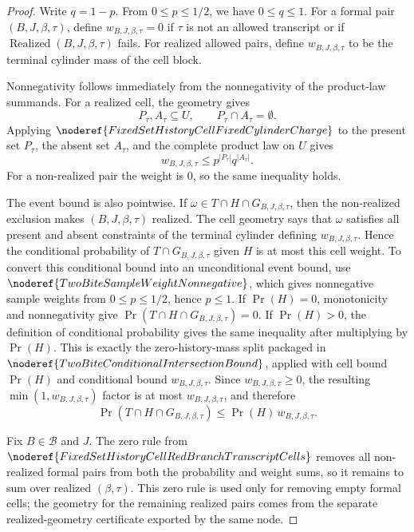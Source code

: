 \begin{proof}
Write \(q=1-p\).  From \(0\le p\le1/2\), we have \(0\le q\le1\).  For a
formal pair \((B,J,\beta,\tau)\), define \(w_{B,J,\beta,\tau}=0\) if
\(\tau\) is not an allowed transcript or if
\(\operatorname{Realized}(B,J,\beta,\tau)\) fails.  For realized allowed
pairs, define \(w_{B,J,\beta,\tau}\) to be the terminal cylinder mass of the
cell block.

Nonnegativity follows immediately from the nonnegativity of the product-law
summands.  For a realized cell, the geometry gives
\[
P_\tau,A_\tau\subseteq U,\qquad P_\tau\cap A_\tau=\emptyset .
\]
Applying \(\noderef{FixedSetHistoryCellFixedCylinderCharge}\) to the present
set \(P_\tau\), the absent set \(A_\tau\), and the complete product law on
\(U\) gives
\[
w_{B,J,\beta,\tau}\le p^{|P_\tau|}q^{|A_\tau|}.
\]
For a non-realized pair the weight is \(0\), so the same inequality holds.

The event bound is also pointwise.  If
\(\omega\in T\cap H\cap G_{B,J,\beta,\tau}\), then the non-realized
exclusion makes \((B,J,\beta,\tau)\) realized.  The cell geometry says that
\(\omega\) satisfies all present and absent constraints of the terminal
cylinder defining \(w_{B,J,\beta,\tau}\).  Hence the conditional probability
of \(T\cap G_{B,J,\beta,\tau}\) given \(H\) is at most this cell weight.  To
convert this conditional bound into an unconditional event bound, use
\(\noderef{TwoBiteSampleWeightNonnegative}\), which gives nonnegative sample
weights from \(0\le p\le1/2\), hence \(p\le1\).  If \(\Pr(H)=0\), monotonicity
and nonnegativity give
\(\Pr(T\cap H\cap G_{B,J,\beta,\tau})=0\).  If \(\Pr(H)>0\), the definition
of conditional probability gives the same inequality after multiplying by
\(\Pr(H)\).  This is exactly the zero-history-mass split packaged in
\(\noderef{TwoBiteConditionalIntersectionBound}\), applied with cell bound
\(\Pr(H)\) and conditional bound \(w_{B,J,\beta,\tau}\).  Since
\(w_{B,J,\beta,\tau}\ge0\), the resulting \( \min(1,w_{B,J,\beta,\tau})\)
factor is at most \(w_{B,J,\beta,\tau}\), and therefore
\[
\Pr(T\cap H\cap G_{B,J,\beta,\tau})
\le \Pr(H)\,w_{B,J,\beta,\tau}.
\]

Fix \(B\in{\mathcal B}\) and \(J\).  The zero rule from
\(\noderef{FixedSetHistoryCellRedBranchTranscriptCells}\) removes all
non-realized formal pairs from both the probability and weight sums, so it
remains to sum over realized \((\beta,\tau)\).  This zero rule is used only
for removing empty formal cells; the geometry for the remaining realized
pairs comes from the separate realized-geometry certificate exported by the
same node.


\end{proof}
